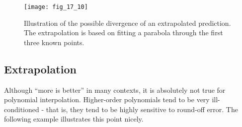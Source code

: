 \documentclass[../main.tex]{subfiles}
\begin{document}
\begin{figure}[H] 
	\centering
	\texttt{[image: fig\_17\_10]}
	\caption{\textsf{Illustration of the possible divergence of an extrapolated prediction. The extrapolation is based
	on fitting a parabola through the first three known points.}}
	\label{fig:fig_17_10}
\end{figure}


\label{cha:cha_P_17_5_2} 
\subsection{Extrapolation}

\noindent Although ``more is better'' in many contexts, it is absolutely not true for polynomial interpolation. Higher-order polynomials tend to be very ill-conditioned - that is, they tend to be
highly sensitive to round-off error. The following example illustrates this point nicely.


\end{document}
